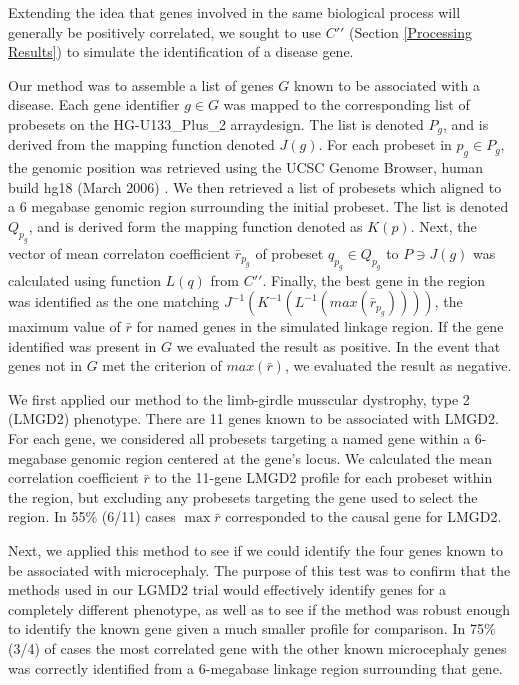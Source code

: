 \documentclass{bioinfo}
\begin{document}
Extending the idea that genes involved in the same biological process will
generally be positively correlated, we sought to use $C\prime\prime$ (Section
\ref{Processing Results}) to simulate the identification of a disease gene.

Our method was to assemble a list of genes $G$ known to be associated with a
disease.  Each gene identifier $g \in G$ was mapped to the corresponding list
of probesets on the HG-U133\_Plus\_2 arraydesign.  The list is denoted $P_g$,
and is derived from the mapping function denoted $J(g)$.  For each probeset in
$p_g \in P_g$, the genomic position was retrieved using the UCSC Genome
Browser, human build hg18 (March 2006) \cite{karolchik}.  We then retrieved a
list of probesets which aligned to a 6 megabase genomic region surrounding the
initial probeset.  The list is denoted $Q_{p_g}$, and is derived form the
mapping function denoted as $K(p)$.  Next, the vector of mean correlaton
coefficient $\bar{r}_{p_g}$ of probeset $q_{p_g} \in Q_{p_g}$ to $P \ni J(g)$
was calculated using function $L(q)$ from $C\prime\prime$.  Finally, the best
gene in the region was identified as the one matching
$J^{-1}(K^{-1}(L^{-1}(max(\bar{r}_{p_g}))))$, the maximum value of $\bar{r}$
for named genes in the simulated linkage region.  If the gene identified was
present in $G$ we evaluated the result as positive.  In the event that genes
not in $G$ met the criterion of $max(\bar{r})$, we evaluated the result as
negative.

We first applied our method to the limb-girdle musscular dystrophy, type 2
(LMGD2) phenotype.  There are 11 genes known to be associated with LMGD2.  For
each gene, we considered all probesets targeting a named gene within a
6-megabase genomic region centered at the gene's locus.  We calculated the mean
correlation coefficient $\bar{r}$ to the 11-gene LMGD2 profile for each
probeset within the region, but excluding any probesets targeting the gene used
to select the region.  In 55\% (6/11) cases $\max{\bar{r}}$ corresponded to the
causal gene for LMGD2.

Next, we applied this method to see if we could identify the four genes known
to be associated with microcephaly.  The purpose of this test was to confirm
that the methods used in our LGMD2 trial would effectively identify genes for a
completely different phenotype, as well as to see if the method was robust
enough to identify the known gene given a much smaller profile for comparison.
In 75\% (3/4) of cases the most correlated gene with the other known
microcephaly genes was correctly identified from a 6-megabase linkage region
surrounding that gene.
\end{document}
